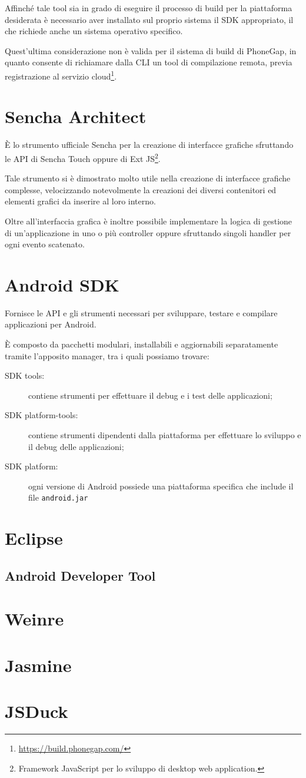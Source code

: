 Affinché tale tool sia in grado di eseguire il processo di build per la piattaforma desiderata è necessario aver installato sul proprio sistema il \ac{SDK} appropriato, il che richiede anche un sistema operativo specifico.

Quest'ultima considerazione non è valida per il sistema di build di PhoneGap, in quanto consente di richiamare dalla \ac{CLI} un tool di compilazione remota, previa registrazione al servizio cloud\footnote{\url{https://build.phonegap.com/}}.

\section{Sencha Architect}
È lo strumento ufficiale Sencha per la creazione di interfacce grafiche sfruttando le \ac{API} di Sencha Touch oppure di Ext JS\footnote{Framework JavaScript per lo  sviluppo di desktop web application.}.

Tale strumento si è dimostrato molto utile nella creazione di interfacce grafiche complesse, velocizzando notevolmente la creazioni dei diversi contenitori ed elementi grafici da inserire al loro interno.

Oltre all'interfaccia grafica è inoltre possibile implementare la logica di gestione di un'applicazione in uno o più controller oppure sfruttando singoli handler per ogni evento scatenato.

\section{Android SDK}
Fornisce le \ac{API} e gli strumenti necessari per sviluppare, testare e compilare applicazioni per Android.

È composto da pacchetti modulari, installabili e aggiornabili separatamente tramite l'apposito manager, tra i quali possiamo trovare:
\begin{description}
\item[SDK tools:] contiene strumenti per effettuare il debug e i test delle applicazioni;
\item[SDK platform-tools:] contiene strumenti dipendenti dalla piattaforma per effettuare lo sviluppo e il debug delle applicazioni;
\item[SDK platform:] ogni versione di Android possiede una piattaforma specifica che include il file \texttt{android.jar} 
\end{description}

\section{Eclipse}

\subsection{Android Developer Tool}


\section{Weinre}

\section{Jasmine}

\section{JSDuck}